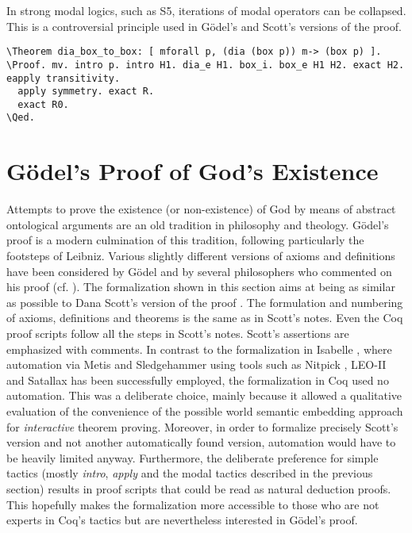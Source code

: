 \documentclass{llncs}
\newcommand{\red}[1]{\textcolor[rgb]{1,0,0}{#1}}
\newcommand{\blue}[1]{\textcolor[rgb]{0,0,1}{#1}}
\newcommand{\Theorem}{\red{Theorem}}
\newcommand{\Proof}{\blue{Proof}}
\newcommand{\Qed}{\blue{Qed}}
\begin{document}
\noindent
In strong modal logics, such as S5, iterations of modal operators can be collapsed. This is a controversial principle used in G\"odel's and Scott's versions of the proof.

\begin{Verbatim}[commandchars=\\\{\},fontsize=\verbsize]
\Theorem dia_box_to_box: [ mforall p, (dia (box p)) m-> (box p) ].
\Proof. mv. intro p. intro H1. dia_e H1. box_i. box_e H1 H2. exact H2. eapply transitivity.
  apply symmetry. exact R.
  exact R0.
\Qed.
\end{Verbatim}


\section{G\"odel's Proof of God's Existence}
\label{sec:proof}

Attempts to prove the existence (or non-existence) of God by means of
abstract ontological arguments are an old tradition in philosophy and
theology.  
G\"{o}del's proof \cite{Goedel1970,GoedelNotes} is a modern culmination of
this tradition, following particularly the footsteps of Leibniz.
Various slightly different versions of axioms and definitions have
been considered by G\"{o}del and by several philosophers who commented
on his proof
(cf. \cite{sobel2004logic,AndersonGettings,Fitting,Adams,ContemporaryBibliography}). The formalization shown in this section aims at
being as similar as possible to Dana Scott's version of the proof \cite{ScottNotes}. The formulation and numbering of axioms, definitions and theorems is the same as in Scott's notes. Even the Coq proof scripts follow all the steps in Scott's notes. Scott's assertions are emphasized with comments. In contrast to the formalization in Isabelle \cite{Archiv}, where automation via Metis \cite{Hurd03first-orderproof} and Sledgehammer \cite{Sledgehammer} using tools such as Nitpick \cite{Nitpick}, LEO-II \cite{LEO-II} and Satallax \cite{Satallax} has been successfully employed, the formalization in Coq used no automation. This was a deliberate choice, mainly because it allowed a qualitative evaluation of the convenience of the possible world semantic embedding approach for \emph{interactive} theorem proving. Moreover, in order to formalize precisely Scott's version and not another automatically found version, automation would have to be heavily limited anyway. Furthermore, the deliberate preference for simple tactics (mostly \emph{intro}, \emph{apply} and the modal tactics described in the previous section) results in proof scripts that could be read as natural deduction proofs. This hopefully makes the formalization more accessible to those who are not experts in Coq's tactics but are nevertheless interested in G\"odel's proof.
\end{document}
